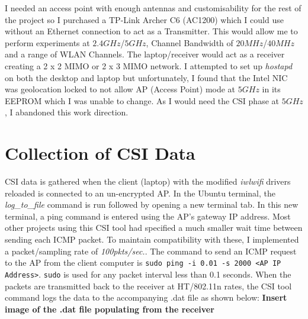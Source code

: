 I needed an access point with enough antennas and customisability for the rest of the project so I purchased a TP-Link Archer C6 (AC1200) which I could use without an Ethernet connection to act as a Transmitter. This would allow me to perform experiments at $2.4GHz$/$5GHz$, Channel Bandwidth of $20MHz$/$40MHz$ and a range of WLAN Channels. The laptop/receiver would act as a receiver creating a 2 x 2 MIMO or 2 x 3 MIMO network. I attempted to set up \textit{hostapd} on both the desktop and laptop but unfortunately, I found that the Intel NIC was geolocation locked to not allow AP (Access Point) mode at $5GHz$ in its EEPROM which I was unable to change. As I would need the CSI phase at $5GHz$, I abandoned this work direction. 
\section{Collection of CSI Data}
CSI data is gathered when the client (laptop) with the modified \textit{iwlwifi} drivers reloaded is connected to an un-encrypted AP. In the Ubuntu terminal, the \textit{log\_to\_file} command is run followed by opening a new terminal tab. In this new terminal, a ping command is entered using the AP's gateway IP address. Most other projects using this CSI tool had specified a much smaller wait time between sending each ICMP packet. To maintain compatibility with these, I implemented a packet/sampling rate of \textit{100pkts/sec.}. The command to send an ICMP request to the AP from the client computer is \lstinline{sudo ping -i 0.01 -s 2000 <AP IP Address>}. \lstinline{sudo} is used for any packet interval less than 0.1 seconds. When the packets are transmitted back to the receiver at HT/802.11n rates, the CSI tool command logs the data to the accompanying .dat file as shown below:
\textbf{Insert image of the .dat file populating from the receiver}
